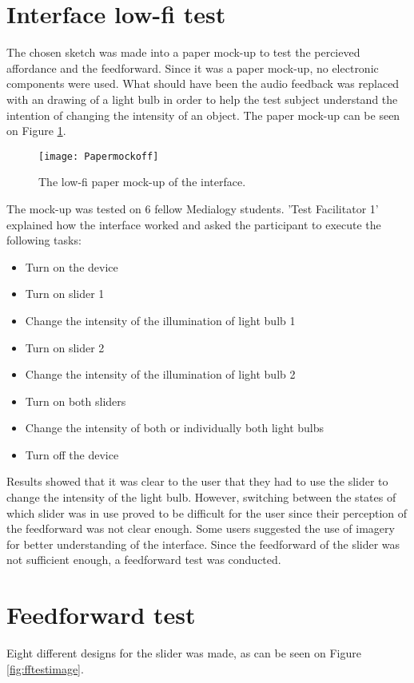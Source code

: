 \section{Interface low-fi test}\label{sec:lowfitest}
The chosen sketch was made into a paper mock-up to test the percieved affordance and the feedforward. Since it was a paper mock-up, no electronic components were used. What should have been the audio feedback was replaced with an drawing of a light bulb in order to help the test subject understand the intention of changing the intensity of an object. The paper mock-up can be seen on Figure \ref{fig:Papermockoff}.

\begin{figure}[!h] 
\centering
\texttt{[image: Papermockoff]}
\caption{\label{fig:Papermockoff} The low-fi paper mock-up of the interface.}
\end{figure}

The mock-up was tested on 6 fellow Medialogy students. 'Test Facilitator 1' explained how the interface worked and asked the participant to execute the following tasks:

\begin{itemize}
\item Turn on the device
\item Turn on slider 1
\item Change the intensity of the illumination of light bulb 1
\item Turn on slider 2
\item Change the intensity of the illumination of light bulb 2
\item Turn on both sliders
\item Change the intensity of both or individually both light bulbs
\item Turn off the device
\end{itemize}

Results showed that it was clear to the user that they had to use the slider to change the intensity of the light bulb. However, switching between the states of which slider was in use proved to be difficult for the user since their perception of the feedforward was not clear enough. Some users suggested the use of imagery for better understanding of the interface. Since the feedforward of the slider was not sufficient enough, a feedforward test was conducted.

\section{Feedforward test}\label{sec:fftest}
Eight different designs for the slider was made, as can be seen on Figure \ref{fig:fftestimage}.

